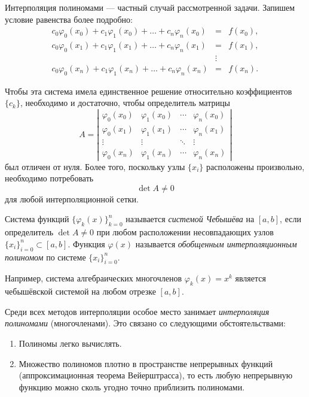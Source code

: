 Интерполяция полиномами --- частный случай рассмотренной
задачи. Запишем условие равенства более подробно:
\begin{eqnarray*}
c_{0}\varphi_{0}(x_{0})+c_{1}\varphi_{1}(x_{0})+\dots+c_{n}\varphi_{n}(x_{0})
& = &
f(x_{0}),\\ c_{0}\varphi_{0}(x_{1})+c_{1}\varphi_{1}(x_{1})+\dots+c_{n}\varphi_{n}(x_{1})
& = & f(x_{1}),\\ &
\vdots\\ c_{0}\varphi_{0}(x_{n})+c_{1}\varphi_{1}(x_{n})+\dots+c_{n}\varphi_{n}(x_{n})
& = & f(x_{n}).
\end{eqnarray*}

Чтобы эта система имела единственное решение относительно
коэффициентов $\{c_{k}\}$, необходимо и достаточно, чтобы определитель
матрицы
\[
A=\left|\begin{array}{cccc} \varphi_{0}(x_{0}) & \varphi_{1}(x_{0}) &
\cdots & \varphi_{n}(x_{0})\\ \varphi_{0}(x_{1}) & \varphi_{1}(x_{1})
& \cdots & \varphi_{n}(x_{1})\\ \vdots & \vdots & \ddots &
\vdots\\ \varphi_{0}(x_{n}) & \varphi_{1}(x_{n}) & \cdots &
\varphi_{n}(x_{n})
\end{array}\right|
\]
был отличен от нуля. Более того, поскольку узлы $\{x_{i}\}$
расположены произвольно, необходимо потребовать
\[
\det A\neq0
\]
для любой интерполяционной сетки.

Система функций $\{\varphi_{k}(x)\}_{k=0}^{n}$ называется
\emph{системой Чебышёва} на $[a,b]$, если определитель $\det A\neq0$
при любом расположении несовпадающих узлов
$\{x_{i}\}_{i=0}^{n}\subset[a,b]$.  Функция $\varphi(x)$ называется
\emph{обобщенным интерполяционным полиномом} по системе
$\{x_{i}\}_{i=0}^{n}$.

Например, система алгебраических многочленов $\varphi_{k}(x)=x^{k}$
является чебышёвской системой на любом отрезке $[a,b]$.


Среди всех методов интерполяции особое место занимает
\emph{интерполяция полиномами} (многочленами). Это связано со
следующими обстоятельствами:
\begin{enumerate}
\item Полиномы легко вычислять.
\item Множество полиномов плотно в пространстве непрерывных функций
  (аппроксимационная теорема Вейерштрасса), то есть любую непрерывную
  функцию можно сколь угодно точно приблизить
  полиномами.
\end{enumerate}

